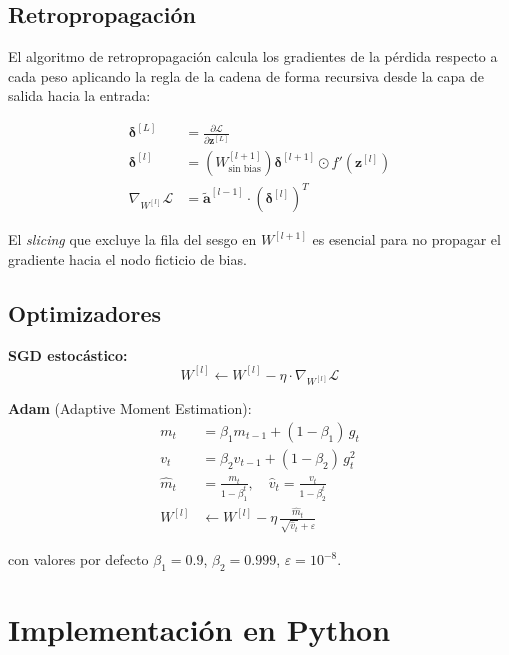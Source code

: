 \subsection{Retropropagación}

El algoritmo de retropropagación calcula los gradientes de la pérdida respecto a cada peso
aplicando la regla de la cadena de forma recursiva desde la capa de salida hacia la entrada:

\begin{align}
    \boldsymbol{\delta}^{[L]} &= \frac{\partial \mathcal{L}}{\partial \mathbf{z}^{[L]}} \\[4pt]
    \boldsymbol{\delta}^{[l]} &= \left(W^{[l+1]}_{\text{sin bias}}\right)\boldsymbol{\delta}^{[l+1]}
                                  \odot f'\!\left(\mathbf{z}^{[l]}\right) \\[4pt]
    \nabla_{W^{[l]}} \mathcal{L} &= \tilde{\mathbf{a}}^{[l-1]} \cdot \left(\boldsymbol{\delta}^{[l]}\right)^T
\end{align}

El \textit{slicing} que excluye la fila del sesgo en $W^{[l+1]}$ es esencial para no
propagar el gradiente hacia el nodo ficticio de bias.

\subsection{Optimizadores}

\textbf{SGD estocástico:}
\begin{equation}
    W^{[l]} \leftarrow W^{[l]} - \eta \cdot \nabla_{W^{[l]}} \mathcal{L}
\end{equation}

\textbf{Adam} (Adaptive Moment Estimation):
\begin{align}
    m_t &= \beta_1 m_{t-1} + (1-\beta_1)\,g_t \\
    v_t &= \beta_2 v_{t-1} + (1-\beta_2)\,g_t^2 \\
    \hat{m}_t &= \frac{m_t}{1-\beta_1^t}, \quad \hat{v}_t = \frac{v_t}{1-\beta_2^t} \\
    W^{[l]} &\leftarrow W^{[l]} - \eta\,\frac{\hat{m}_t}{\sqrt{\hat{v}_t}+\varepsilon}
\end{align}

con valores por defecto $\beta_1=0.9$, $\beta_2=0.999$, $\varepsilon=10^{-8}$.

\section{Implementación en Python}

